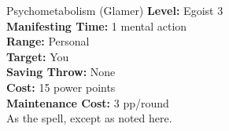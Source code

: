 {Psychometabolism (Glamer)}
{
	\textbf{Level:}
	Egoist 3\\
	\textbf{Manifesting Time:}
	1 mental action\\
	\textbf{Range:}
	Personal\\
	\textbf{Target:}
	You\\
	\textbf{Saving Throw:}
	None\\
	\textbf{Cost:}
	15 power points\\
	\textbf{Maintenance Cost:}
	3 pp/round\\
}
{
	As the  spell, except as noted here.
}
